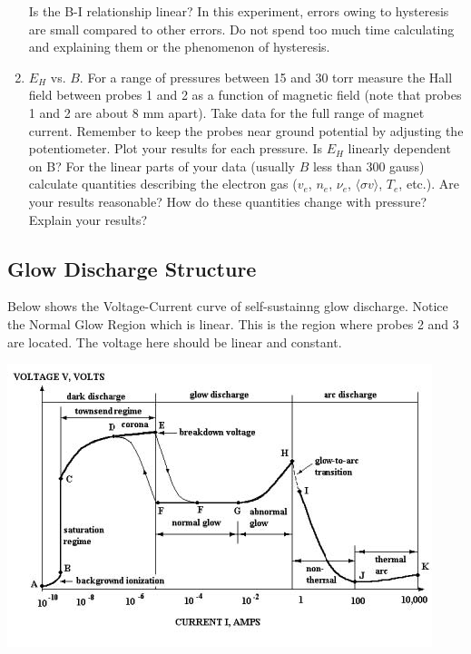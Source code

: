 \documentclass{../lab}
\begin{document}
\begin{enumerate}
    Is the B-I relationship linear? In this experiment, errors owing to hysteresis are small compared to other errors. Do not spend too much time calculating and explaining them or the phenomenon of hysteresis.

    \item $E_H$ vs. $B$. For a range of pressures between 15 and 30 torr measure the Hall field between probes 1 and 2 as a function of magnetic field (note that probes 1 and 2 are about 8 mm apart). Take data for the full range of magnet current. Remember to keep the probes near ground potential by adjusting the potentiometer. Plot your results for each pressure. Is $E_H$ linearly dependent on B? For the linear parts of your data (usually $B$ less than 300 gauss) calculate quantities describing the electron gas ($v_e$, $n_e$, $\nu_e$, $\langle \sigma v \rangle$, $T_e$, etc.). Are your results reasonable? How do these quantities change with pressure? Explain your results?

\end{enumerate}

\subsection{Glow Discharge Structure}

Below shows the Voltage-Current curve of self-sustainng glow discharge. Notice the Normal Glow Region which is linear. This is the region where probes 2 and 3 are located. The voltage here should be linear and constant.

\begin{center}
    \href{http://experimentationlab.berkeley.edu/sites/default/files/images/DischargeStructure.jpg}{\includegraphics[width=0.8\linewidth]{images/DischargeStructure.jpg}}
\end{center}
\end{document}
